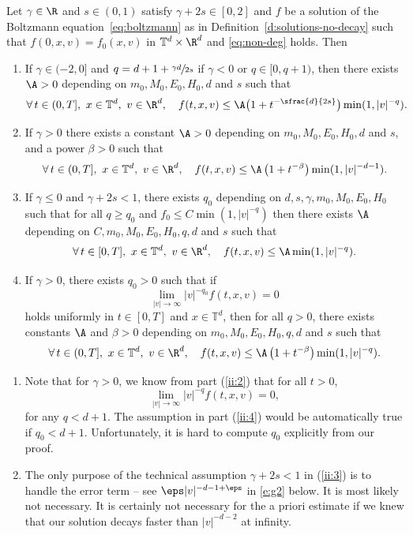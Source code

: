 \begin{thm}\label{thm:upper2}
Let $\gamma \in \R$ and $s \in (0,1)$ satisfy $\gamma +2s \in [0,2]$
and $f$ be a solution of the Boltzmann equation~\eqref{eq:boltzmann}
as in Definition~\ref{d:solutions-no-decay} such that
$f(0,x,v)=f_0(x,v)$ in $\mathbb{T}^d \times \R^d$ and \eqref{eq:non-deg}
holds. Then
\begin{enumerate}
\item \label{ii:1} If $\gamma \in (-2,0]$ and
$q = d+1+\sfrac{\gamma d}{2s}$ if $\gamma <0$ or $q \in [0,q+1)$,
then there exists $\A>0$ depending on $m_0,M_0,E_0, H_0, d$ and $s$
such that
\[
\forall \, t \in (0,T], \ x \in \mathbb{T}^d, \ v \in \R^d, \quad
f(t,x,v) \le \A \bigl(1+t^{-\sfrac{d}{2s}} \bigr) \min
(1,|v|^{-q}).
\]
\item \label{ii:2} If $\gamma >0$ there exists a constant $\A>0$
depending on $m_0,M_0,E_0,H_0,d$ and $s$, and a power $\beta>0$ such
that
\[ \forall \, t \in (0,T], \ x \in \mathbb{T}^d, \ v \in \R^d, \quad
f(t,x,v) \le \A \left(1+t^{-\beta} \right) \min(1,|v|^{-d-1}
).\]
\item \label{ii:3} If $\gamma \leq 0$ and $\gamma+2s < 1$, there
exists $q_0$ depending on $d,s,\gamma, m_0,M_0,E_0,H_0$ such that for
all $q \ge q_0$ and $f_0 \le C \min (1 , |v|^{-q})$ then there
exists $\A$ depending on $C,m_0,M_0,E_0,H_0,q, d$ and $s$ such that
\[
\forall \, t \in [0,T], \ x \in \mathbb{T}^d, \ v \in \R^d, \quad
f (t,x,v) \le \A \min(1, |v|^{-q}).
\]
\item \label{ii:4} If $\gamma > 0$, there exists $q_0 >0$ such that if
\[ \lim_{|v| \to \infty} |v|^{-q_0} f(t,x,v) = 0\] holds
uniformly in $t \in [0,T]$ and $x \in \mathbb{T}^d$, then for all
$q>0$, there exists constants $\A$ and $\beta>0$ depending on
$m_0,M_0,E_0,H_0,q,d$ and $s$ such that
\[
\forall \, t \in (0,T], \ x \in \mathbb{T}^d, \ v \in \R^d,
\quad f(t,x,v) \le \A \left(1+t^{-\beta} \right) \min
(1,|v|^{-q}).
\]
\end{enumerate}
\end{thm}

\skpt
\begin{remark}
\begin{enumerate}
\item Note that for $\gamma >0$, we know from part (\ref{ii:2})
that for all $t>0$,
\[ \lim_{|v| \to \infty} |v|^{-q} f(t,x,v) = 0, \]
for any $q <
d+1$. The assumption in part (\ref{ii:4}) would be automatically
true if $q_0 < d+1$. Unfortunately, it is hard to compute $q_0$
explicitly from our proof.
\item \label{rem:gammaplus2s}
The only purpose of the technical assumption $\gamma+2s<1$ in
(\ref{ii:3}) is to handle the error term -- see
$\eps |v|^{-d-1+\eps}$ in \eqref{e:g2} below. It is most likely not
necessary. It is certainly not necessary for the a priori estimate
if we knew that our solution decays faster than $|v|^{-d-2}$ at
infinity.
\end{enumerate}
\end{remark}

